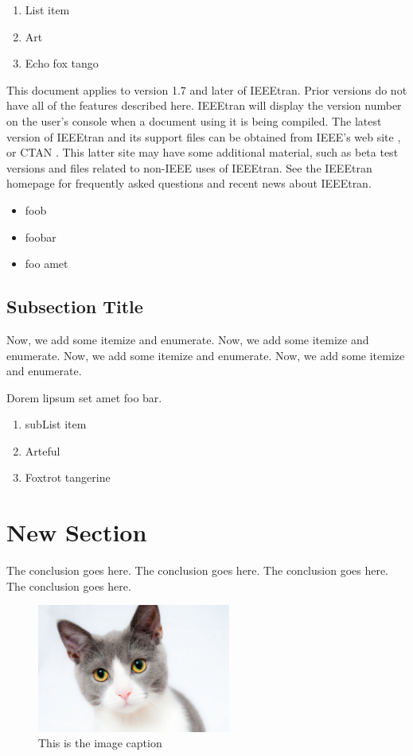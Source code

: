 \documentclass[10pt,conference,compsocconf]{IEEEtran}
\begin{document}
\begin{enumerate}
\item List item
\item Art
\item Echo fox tango
\end{enumerate}

This document applies to version 1.7 and later of IEEEtran. Prior versions do
not have all of the features described here. IEEEtran will display the version
number on the user’s console when a document using it is being compiled. The
latest version of IEEEtran and its support files can be obtained from IEEE’s web
site \cite{Firstman:2014}, or CTAN \cite{Fubtutorial:2014}. This latter site may have some
additional material, such as beta test versions and files related to non-IEEE
uses of IEEEtran. See the IEEEtran homepage \cite{Bookman:2014} for frequently asked
questions and recent news about IEEEtran.

\begin{itemize}
\item foob
\item foobar
\item foo amet
\end{itemize}

\subsection{Subsection Title}
\label{subsectiontitle}

Now, we add some itemize and enumerate. Now, we add some itemize and enumerate.
Now, we add some itemize and enumerate. Now, we add some itemize and enumerate.

Dorem lipsum set amet foo bar.

\begin{enumerate}
\item subList item
\item Arteful
\item Foxtrot tangerine
\end{enumerate}

\section{New Section}
\label{newsection}

The conclusion goes here. The conclusion goes here. The conclusion goes here.
The conclusion goes here.

\begin{figure}[htbp]
\centering
\includegraphics[width=2.5in]{img/test1_cat.jpg}
\caption{This is the image caption}
\label{image_label}
\end{figure}



\end{document}
